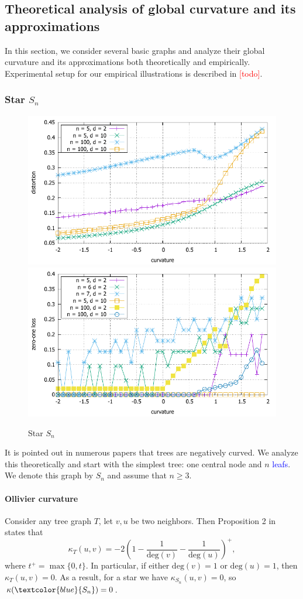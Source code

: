 \documentclass{article} %
\newcommand{\ph}[1]{\textcolor{blue}{#1}}
\begin{document}
\subsection{Theoretical analysis of global curvature and its approximations}

In this section, we consider several basic graphs and analyze their global curvature and its approximations both theoretically and empirically. Experimental setup for our empirical illustrations is described in \textcolor{red}{[todo]}.

\subsubsection{Star $S_n$}

\begin{figure}
    \centering
    \includegraphics[width = 0.49 \textwidth]{star_distortion.pdf}
    \includegraphics[width = 0.49 \textwidth]{star_zero_one.pdf}
    \caption{Star $S_n$}
    \label{fig:star}
\end{figure}

It is pointed out in numerous papers that trees are negatively curved. 
We analyze this theoretically and start with the simplest tree: one central node and $n$ \ph{leafs}. We denote this graph by $S_n$ and assume that $n \ge 3$.

\paragraph{Ollivier curvature} 
Consider any tree graph $T$, let $v, u$ be two neighbors. Then Proposition 2 in~\citep{jost2014ollivier} states that
\begin{equation}\label{eq:ollivier_tree}
	\kappa_T(u,v) = -2\left(1 - \frac{1}{\mathrm{deg}(v)} - \frac{1}{\mathrm{deg}(u)}\right)^+, 
\end{equation}
where $t^+ = \max\{0,t\}$. In particular, if either $\mathrm{deg}(v) = 1$ or $\mathrm{deg}(u) = 1$, then $\kappa_T(u,v) = 0$.  As a result, for a star we have $\kappa_{S_n}(u,v) = 0$, so $\kappa(\ph{S_n}) = 0$.
\end{document}
